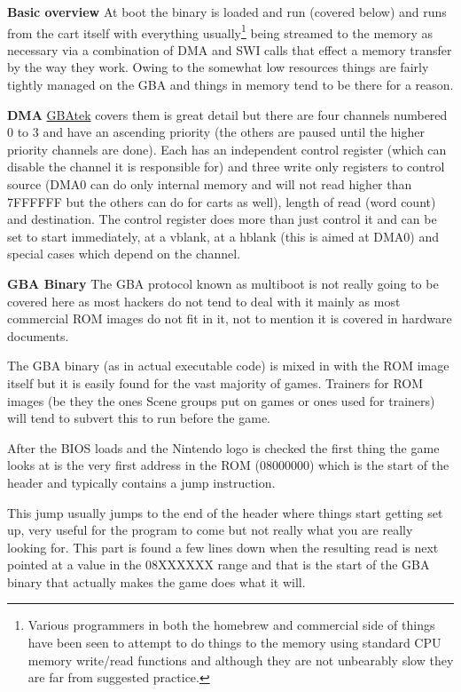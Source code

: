 \documentclass[
]{book}
\begin{document}
\textbf{Basic overview} At boot the binary is loaded and run (covered below) and runs from the cart itself with everything usually\footnote{Various programmers in both the homebrew and commercial side of things have been seen to attempt to do things to the memory using standard CPU memory write/read functions and although they are not unbearably slow they are far from suggested practice.} being streamed to the memory as necessary via a combination of DMA and SWI calls that effect a memory transfer by the way they work. Owing to the somewhat low resources things are fairly tightly managed on the GBA and things in memory tend to be there for a reason.

\textbf{DMA} \href{http://problemkaputt.de/gbatek.htm\#gbadmatransfers}{GBAtek} covers them is great detail but there are four channels numbered 0 to 3 and have an ascending priority (the others are paused until the higher priority channels are done). Each has an independent control register (which can disable the channel it is responsible for) and three write only registers to control source (DMA0 can do only internal memory and will not read higher than 7FFFFFF but the others can do for carts as well), length of read (word count) and destination. The control register does more than just control it and can be set to start immediately, at a vblank, at a hblank (this is aimed at DMA0) and special cases which depend on the channel.

\textbf{GBA Binary} The GBA protocol known as multiboot is not really going to be covered here as most hackers do not tend to deal with it mainly as most commercial ROM images do not fit in it, not to mention it is covered in hardware documents.

The GBA binary (as in actual executable code) is mixed in with the ROM image itself but it is easily found for the vast majority of games. Trainers for ROM images (be they the ones Scene groups put on games or ones used for trainers) will tend to subvert this to run before the game.

After the BIOS loads and the Nintendo logo is checked the first thing the game looks at is the very first address in the ROM (08000000) which is the start of the header and typically contains a jump instruction.

This jump usually jumps to the end of the header where things start getting set up, very useful for the program to come but not really what you are really looking for. This part is found a few lines down when the resulting read is next pointed at a value in the 08XXXXXX range and that is the start of the GBA binary that actually makes the game does what it will.
\end{document}
